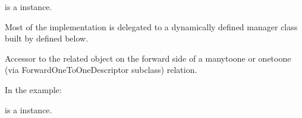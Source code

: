 \documentclass[a4paper,11pt,spanish]{sphinxmanual}
\begin{document}
\begin{fulllineitems}
\begin{fulllineitems}
\sphinxAtStartPar
{} is a  instance.

\sphinxAtStartPar
Most of the implementation is delegated to a dynamically defined manager
class built by  defined below.

\end{fulllineitems}


\begin{fulllineitems}
\label{\detokenize{api/inventory/inventory.models:inventory.models.ProductLot.objects}}
\pysigstartsignatures
\pysigline
{}
\pysigstopsignatures
\end{fulllineitems}


\begin{fulllineitems}
\label{\detokenize{api/inventory/inventory.models:inventory.models.ProductLot.product}}
\pysigstartsignatures
\pysigline
{}
\pysigstopsignatures
\sphinxAtStartPar
Accessor to the related object on the forward side of a many\sphinxhyphen{}to\sphinxhyphen{}one or
one\sphinxhyphen{}to\sphinxhyphen{}one (via ForwardOneToOneDescriptor subclass) relation.

\sphinxAtStartPar
In the example:

\begin{sphinxVerbatim}[commandchars=\\\{\}]
       
\end{sphinxVerbatim}

\sphinxAtStartPar
{} is a  instance.

\end{fulllineitems}


\begin{fulllineitems}
\label{\detokenize{api/inventory/inventory.models:inventory.models.ProductLot.product_id}}
\pysigstartsignatures
\pysigline
{}
\pysigstopsignatures
\end{fulllineitems}


\end{fulllineitems}
\end{document}
